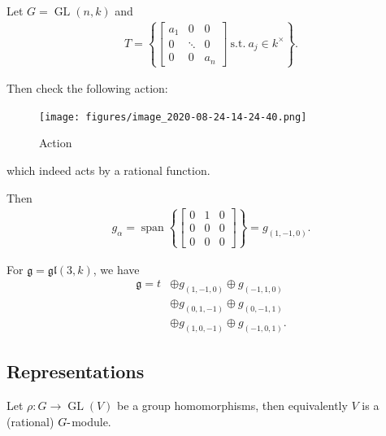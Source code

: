 \begin{example}

\begin{example}

Let \(G = \operatorname{GL}(n, k)\) and
\begin{align*}   T = \left\{{ \begin{bmatrix} a_1 & 0 & 0 \\ 0 & \ddots & 0 \\ 0 & 0 & a_n \end{bmatrix} ~{\text{s.t.}}~a_j\in k^{\times} }\right\} .\end{align*}

Then check the following action:

\begin{figure}
\centering
\texttt{[image: figures/image\_2020-08-24-14-24-40.png]}
\caption{Action}
\end{figure}

which indeed acts by a rational function.

Then
\begin{align*}   g_\alpha = {\operatorname{span}}\left\{{ \begin{bmatrix} 0 & 1 & 0 \\ 0 & 0 & 0\\ 0 & 0 & 0 \end{bmatrix} }\right\} = g_{(1, -1, 0)} .\end{align*}

For \({\mathfrak{g}}= {\mathfrak{gl}}(3, k)\), we have
\begin{align*}   {\mathfrak{g}}= t  &\oplus g_{(1, -1, 0)} \oplus g_{(-1, 1, 0)}  \\ &\oplus g_{(0, 1, -1)}  \oplus g_{(0, -1, 1)}  \\ &\oplus g_{(1, 0, -1)}  \oplus g_{(-1, 0, 1)}  .\end{align*}

\end{example}

\end{example}

\hypertarget{representations}{%
\subsection{Representations}\label{representations}}

Let \(\rho: G\to \operatorname{GL}(V)\) be a group homomorphisms, then
equivalently \(V\) is a (rational) \(G{\hbox{-}}\)module.

